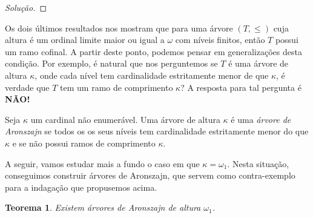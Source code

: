 \documentclass[a4paper]{article}
\theoremstyle{plain}\newtheorem{teo}{Teorema}[section]
\begin{document}
\begin{proof}[Solução]
  
  \end{proof}
  

  Os dois últimos resultados nos mostram que para uma árvore \((T,\leq)\) cuja altura é um
  ordinal limite maior ou igual a \(\omega\) com níveis finitos, então \(T\)
  possui um ramo cofinal. A partir deste ponto, podemos pensar em generalizações
  desta condição. Por exemplo, é natural que nos perguntemos se $T$ é uma árvore
  de altura $\kappa$, onde cada nível tem cardinalidade estritamente menor de
  que \(\kappa\), é verdade que $T$ tem um
  ramo de comprimento $\kappa$?  A resposta para tal pergunta é \textbf{NÃO!}

  \begin{definition}
    Seja \(\kappa\) um cardinal não enumerável.
    Uma árvore de altura $\kappa$ é uma \textit{árvore de Aronszajn} se
    todos os os seus níveis tem cardinalidade estritamente menor do que \(\kappa\)
    e se não possui ramos de comprimento $\kappa$.
  \end{definition}

 A seguir, vamos estudar mais a fundo o caso em que \(\kappa=\omega_1\). Nesta
  situação, conseguimos construir árvores de Aronszajn, que servem como
  contra-exemplo  para a indagação que propusemos acima.
  
    \begin{teo}
  Existem árvores de Aronszajn de altura $\omega_1$.
    \end{teo}
\end{document}
